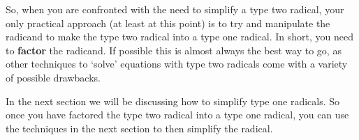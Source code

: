 \documentclass{ximera}
\begin{document}
    So, when you are confronted with the need to simplify a type two radical, your only practical approach (at least at this point) is to try and manipulate the radicand to make the type two radical into a type one radical. In short, you need to \textbf{factor} the radicand. If possible this is almost always the best way to go, as other techniques to `solve' equations with type two radicals come with a variety of possible drawbacks.
    
    In the next section we will be discussing how to simplify type one radicals. So once you have factored the type two radical into a type one radical, you can use the techniques in the next section to then simplify the radical.




%
%
%
%
%
\end{document}
